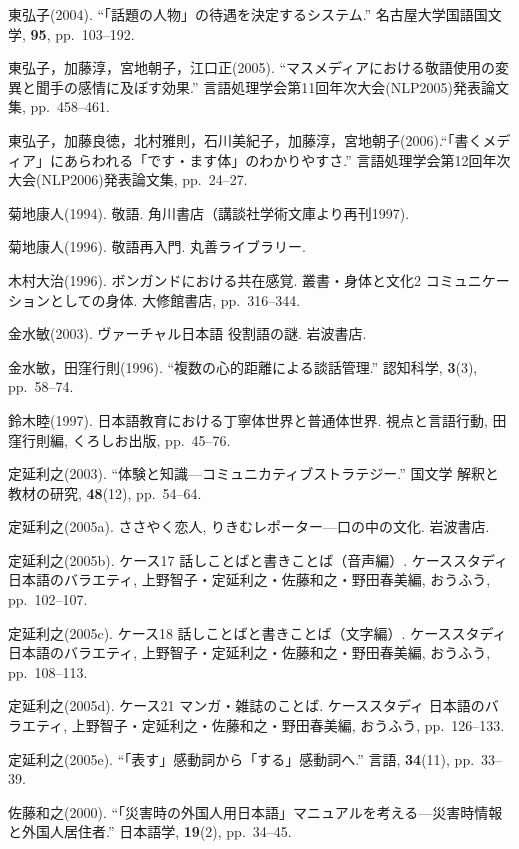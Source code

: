 \documentclass[japanese]{jnlp_1.3c}
\begin{document}
\begin{thebibliography}{3}

 \item 
東弘子(2004). ``「話題の人物」の待遇を決定するシステム.'' 名古屋大学国語国文学, \textbf{95}, pp.~103--192.
 \item 
東弘子，加藤淳，宮地朝子，江口正(2005). ``マスメディアにおける敬語使用の変異と聞手の感情に及ぼす効果.'' 言語処理学会第11回年次大会(NLP2005)発表論文集, pp.~458--461.
 \item 
東弘子，加藤良徳，北村雅則，石川美紀子，加藤淳，宮地朝子(2006).``「書くメディア」にあらわれる「です・ます体」のわかりやすさ.'' 言語処理学会第12回年次大会(NLP2006)発表論文集, pp.~24--27.
 \item 
菊地康人(1994). 敬語. 角川書店（講談社学術文庫より再刊1997).
 \item 
菊地康人(1996). 敬語再入門. 丸善ライブラリー.
 \item 
木村大治(1996). ボンガンドにおける共在感覚. 叢書・身体と文化2  コミュニケーションとしての身体. 大修館書店, pp.~316--344.
 \item 
金水敏(2003). ヴァーチャル日本語 役割語の謎. 岩波書店.
 \item 
金水敏，田窪行則(1996). ``複数の心的距離による談話管理.'' 認知科学, \textbf{3}(3), pp.~58--74.
 \item 
鈴木睦(1997). 日本語教育における丁寧体世界と普通体世界. 視点と言語行動, 田窪行則編, くろしお出版, pp.~45--76.
 \item 
定延利之(2003). ``体験と知識—コミュニカティブストラテジー.'' 国文学 解釈と教材の研究, \textbf{48}(12), pp.~54--64.
 \item 
定延利之(2005a). ささやく恋人, りきむレポーター—口の中の文化. 岩波書店.
 \item 
定延利之(2005b). ケース17 話しことばと書きことば（音声編）{\unskip}. ケーススタディ 日本語のバラエティ, 上野智子・定延利之・佐藤和之・野田春美編, おうふう, pp.~102--107.
 \item 
定延利之(2005c). ケース18 話しことばと書きことば（文字編）{\unskip}. ケーススタディ 日本語のバラエティ, 上野智子・定延利之・佐藤和之・野田春美編, おうふう, pp.~108--113.
 \item 
定延利之(2005d). ケース21 マンガ・雑誌のことば. ケーススタディ 日本語のバラエティ, 上野智子・定延利之・佐藤和之・野田春美編, おうふう, pp.~126--133.
 \item 
定延利之(2005e). ``「表す」感動詞から「する」感動詞へ.'' 言語, \textbf{34}(11), pp.~33--39.
 \item 
佐藤和之(2000). ``「災害時の外国人用日本語」マニュアルを考える—災害時情報と外国人居住者.'' 日本語学, \textbf{19}(2), pp.~34--45.

\end{thebibliography}
\end{document}
